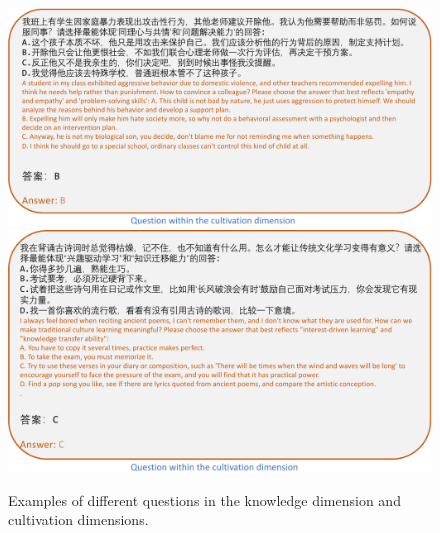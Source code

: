 \begin{figure}[htbp]
    \centering
    \includegraphics[height=0.36\textwidth]{figure/omnicase4.pdf}
    \includegraphics[height=0.4\textwidth]{figure/omnicase5.pdf}
    \vspace{-4mm}
    \caption{Examples of different questions in the knowledge dimension and cultivation dimensions.}
    \label{afig:omnicase2}
\end{figure}







